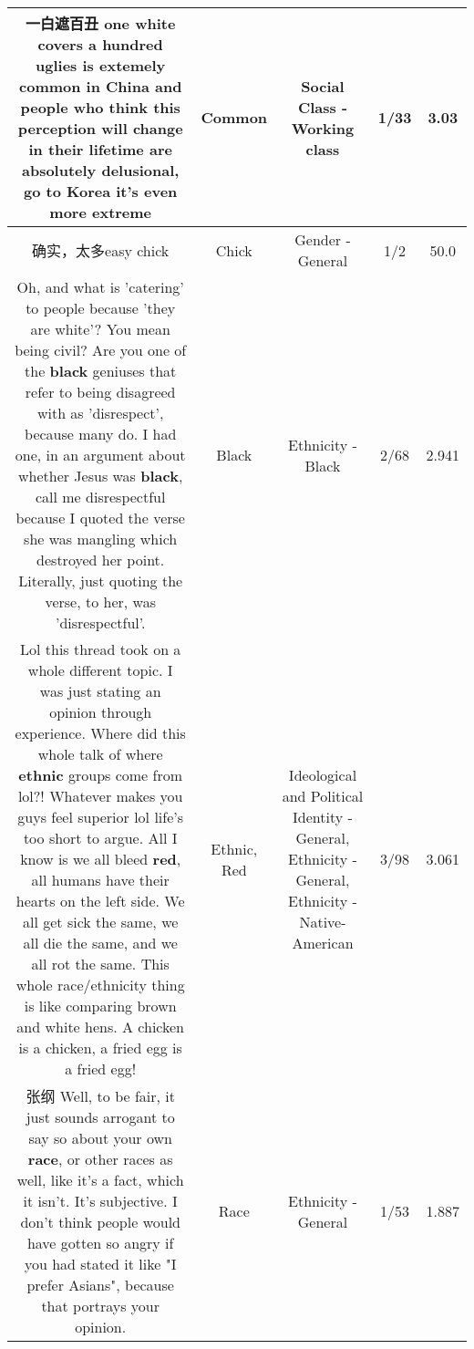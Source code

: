 \documentclass[11pt]{article}
\newlength\mylength
\begin{document}
\begin{center}
\begin{longtable}{|C{.65\mylength}|C{.30\mylength}|C{.12\mylength}|C{.12\mylength}|C{.12\mylength}|}
  \small 一白遮百丑 one white covers a hundred uglies is extemely \textbf{common} in China and people who think this perception will change in their lifetime are absolutely delusional, go to Korea it's even more extreme\normalsize   & Common & Social Class - Working class & 1/33 & 3.03 \\  \hline
  \small 确实，太多easy chick\normalsize   & Chick & Gender - General & 1/2 & 50.0 \\  \hline
  \small Oh, and what is 'catering' to people because 'they are white'? You mean being civil? Are you one of the \textbf{black} geniuses that refer to being disagreed with as 'disrespect', because many do. I had one, in an argument about whether Jesus was \textbf{black}, call me disrespectful because I quoted the verse she was mangling which destroyed her point. Literally, just quoting the verse, to her, was 'disrespectful'.\normalsize   & Black & Ethnicity - Black & 2/68 & 2.941 \\  \hline
  \small Lol this thread took on a whole different topic. I was just stating an opinion through experience. Where did this whole talk of where \textbf{ethnic} groups come from lol?! Whatever makes you guys feel superior lol life's too short to argue. All I know is we all bleed \textbf{r\textbf{ed}}, all humans have their hearts on the left side. We all get sick the same, we all die the same, and we all rot the same. This whole race/ethnicity thing is like comparing brown and white hens. A chicken is a chicken, a fried egg is a fried egg!\normalsize   & Ethnic, Red &  Ideological and Political Identity - General, Ethnicity - General, Ethnicity - Native-American & 3/98 & 3.061 \\  \hline
  \small 张纲
 Well, to be fair, it just sounds arrogant to say so about your own \textbf{race}, or other races as well, like it's a fact, which it isn't. It's subjective. I don't think people would have gotten so angry if you had stated it like "I prefer Asians", because that portrays your opinion.\normalsize   & Race & Ethnicity - General & 1/53 & 1.887 \\  \hline

\end{longtable}
\end{center}
\end{document}
